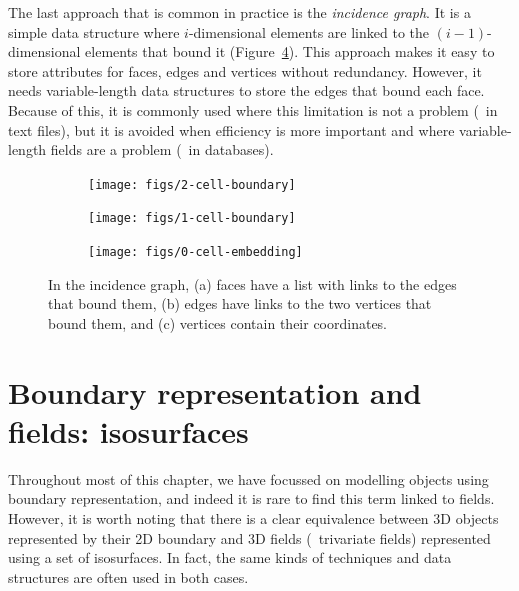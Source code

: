 The last approach that is common in practice is the \emph{incidence graph}.
It is a simple data structure where \(i\)-dimensional elements are linked to the \((i-1)\)-dimensional elements that bound it (Figure~\ref{fig:incidencegraph}).
This approach makes it easy to store attributes for faces, edges and vertices without redundancy.
However, it needs variable-length data structures to store the edges that bound each face.
Because of this, it is commonly used where this limitation is not a problem (\eg\ in text files), but it is avoided when efficiency is more important and where variable-length fields are a problem (\eg\ in databases).

\begin{figure}
\centering
\begin{subfigure}[b]{0.27\linewidth}
\texttt{[image: figs/2-cell-boundary]}
\caption{}%
\label{subfig:2-cell-boundary}
\end{subfigure}
\quad
\begin{subfigure}[b]{0.27\linewidth}
\texttt{[image: figs/1-cell-boundary]}
\caption{}%
\label{subfig:1-cell-boundary}
\end{subfigure}
\quad
\begin{subfigure}[b]{0.27\linewidth}
\texttt{[image: figs/0-cell-embedding]}
\caption{}%
\label{subfig:0-cell-embedding}
\end{subfigure}
\caption[The incidence graph]{In the incidence graph, (a) faces have a list with links to the edges that bound them, (b) edges have links to the two vertices that bound them, and (c) vertices contain their coordinates.}%
\label{fig:incidencegraph}
\end{figure}

\section{Boundary representation and fields: isosurfaces}

Throughout most of this chapter, we have focussed on modelling objects using boundary representation, and indeed it is rare to find this term linked to fields.
However, it is worth noting that there is a clear equivalence between 3D objects represented by their 2D boundary and 3D fields (\ie\ trivariate fields) represented using a set of isosurfaces.
In fact, the same kinds of techniques and data structures are often used in both cases.

